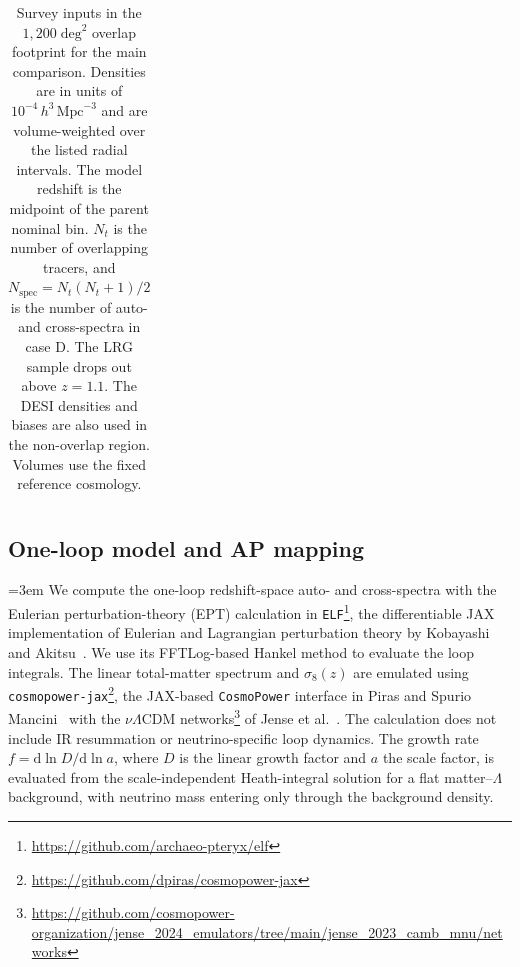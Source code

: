 \documentclass[a4paper,11pt]{article}
\newcommand{\revchange}[1]{{\color{RevisionColor}#1}}
\newcommand{\dd}{\mathrm{d}}
\begin{document}
\begin{table}[t]
\begin{tabular}{llrrrrrrrrrrr}
\hline
\end{tabular}
\caption{\revchange{Survey inputs in the $1{,}200\;\mathrm{deg}^2$
overlap footprint for the main comparison. Densities are} in
units of $10^{-4}\,h^3\,\mathrm{Mpc}^{-3}$ \revchange{and are
volume-weighted over the listed radial intervals.
The model redshift is the midpoint of the parent nominal bin.} $N_t$ is the number of overlapping tracers\revchange{, and}
$N_{\mathrm{spec}}=N_t(N_t+1)/2$ is the number of auto- and
cross-spectra \revchange{in case D.}
The LRG sample drops out above $z=1.1$. \revchange{The DESI densities and
biases are also used in the non-overlap region. Volumes use
the fixed reference cosmology.}}
\label{tab:surveys}
\end{table}

\subsection{\texorpdfstring{\revchange{One-loop model and AP mapping}}{One-loop model and AP mapping}}
\label{sec:eft_model}

{\emergencystretch=3em
\revchange{We compute the one-loop redshift-space auto- and cross-spectra
with the Eulerian perturbation-theory (EPT) calculation in
\texttt{ELF}\footnote{\url{https://github.com/archaeo-pteryx/elf}},
the differentiable JAX implementation of Eulerian and Lagrangian
perturbation theory by Kobayashi and Akitsu~\cite{Kobayashi:2026eee}.
We use its FFTLog-based Hankel method to evaluate the loop integrals.
The linear total-matter spectrum and $\sigma_8(z)$ are emulated
using} \texttt{cosmopower-jax}\footnote{\url{https://github.com/dpiras/cosmopower-jax}}, the JAX-based \texttt{CosmoPower} interface in Piras and Spurio Mancini~\cite{Piras:2023aub}
\revchange{with the $\nu\Lambda$CDM} networks\footnote{\url{https://github.com/cosmopower-organization/jense_2024_emulators/tree/main/jense_2023_camb_mnu/networks}} of Jense
et al.~\cite{Jense:2024llt}.
\revchange{The calculation
does not include IR resummation or neutrino-specific loop
dynamics.
The growth rate $f=\dd\ln D/\dd\ln a$, where $D$ is the
linear growth factor and $a$ the scale factor, is evaluated
from the scale-independent Heath-integral solution for a flat
matter--$\Lambda$ background, with neutrino mass entering only
through the background density.}\par}
\end{document}
